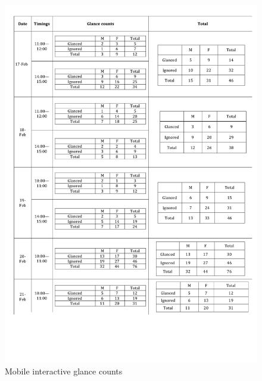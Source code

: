\begin{appendices}
\begin{figure}[H]
 \centering 
    \includegraphics[width=\textwidth,height=0.8\textheight]{Appendices/8/mobile-interactive/mobile-interactive_glances.pdf}
   \caption{Mobile interactive glance counts}
     \label{app:mobile-interactive-glancecount}%
\end{figure}




\end{appendices}
